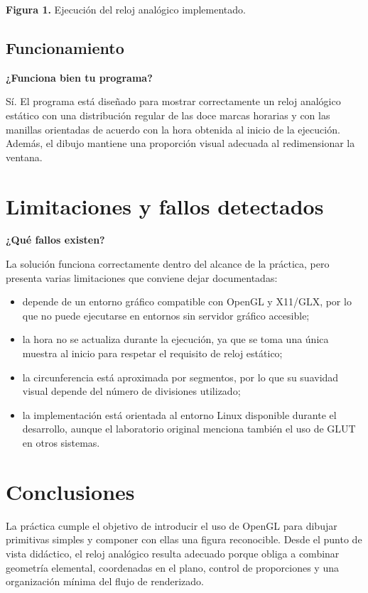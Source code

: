 \documentclass[12pt,a4paper]{article}
\begin{document}
\smallskip

\textbf{Figura 1.} Ejecución del reloj analógico implementado.

\subsection{Funcionamiento}
\textbf{¿Funciona bien tu programa?}

Sí. El programa está diseñado para mostrar correctamente un reloj analógico estático con una distribución regular de las doce marcas horarias y con las manillas orientadas de acuerdo con la hora obtenida al inicio de la ejecución. Además, el dibujo mantiene una proporción visual adecuada al redimensionar la ventana.

\section{Limitaciones y fallos detectados}
\textbf{¿Qué fallos existen?}

La solución funciona correctamente dentro del alcance de la práctica, pero presenta varias limitaciones que conviene dejar documentadas:

\begin{itemize}[leftmargin=*]
    \item depende de un entorno gráfico compatible con OpenGL y X11/GLX, por lo que no puede ejecutarse en entornos sin servidor gráfico accesible;
    \item la hora no se actualiza durante la ejecución, ya que se toma una única muestra al inicio para respetar el requisito de reloj estático;
    \item la circunferencia está aproximada por segmentos, por lo que su suavidad visual depende del número de divisiones utilizado;
    \item la implementación está orientada al entorno Linux disponible durante el desarrollo, aunque el laboratorio original menciona también el uso de GLUT en otros sistemas.
\end{itemize}

\section{Conclusiones}
La práctica cumple el objetivo de introducir el uso de OpenGL para dibujar primitivas simples y componer con ellas una figura reconocible. Desde el punto de vista didáctico, el reloj analógico resulta adecuado porque obliga a combinar geometría elemental, coordenadas en el plano, control de proporciones y una organización mínima del flujo de renderizado.
\end{document}
